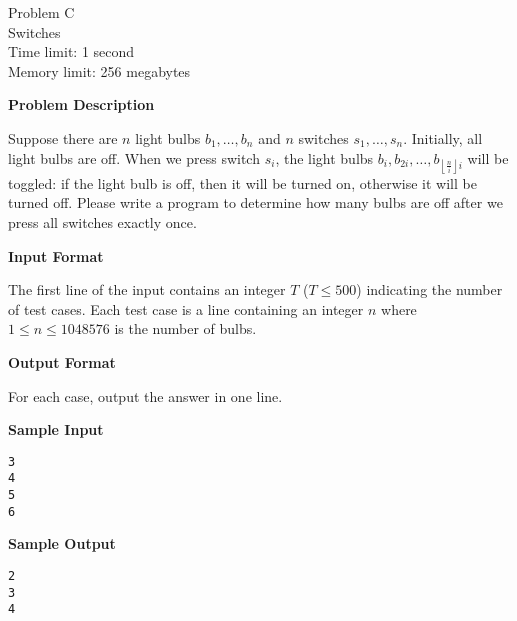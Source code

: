 \documentclass[11pt]{article}
\begin{document}
\begin{center}
    {\LARGE Problem C}\\
    {\Large Switches}\\
    {Time limit: 1 second}\\
    {Memory limit: 256 megabytes}
\end{center}

\textbf{\large Problem Description}

Suppose there are $n$ light bulbs $b_1,\dots,b_n$ and $n$ switches 
$s_1,\dots,s_n$. Initially, all light bulbs are off. When we press switch
$s_i$, the light bulbs $b_i,b_{2i},\dots,b_{\left\lfloor\frac{n}{i}\right\rfloor
i}$ will be toggled: if the light bulb is off, then it will be turned on,
otherwise it will be turned off. Please write a program to determine how
many bulbs are off after we press all switches exactly once.

\textbf{\large Input Format}

The first line of the input contains an integer $T$ ($T\le 500$) indicating 
the number of test cases. Each test case is a line containing an integer $n$
where $1\le n\le 1048576$ is the number of bulbs.

\textbf{\large Output Format}

For each case, output the answer in one line.

\textbf{\large Sample Input}

\begin{verbatim}
3
4
5
6
\end{verbatim}

\textbf{\large Sample Output}
\begin{verbatim}
2
3
4
\end{verbatim}
\end{document}
